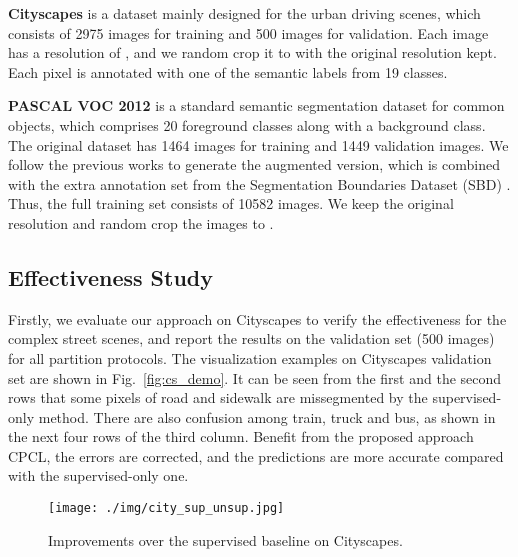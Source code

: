 \documentclass[journal]{IEEEtran}
\begin{document}
\textbf{Cityscapes} is a dataset mainly designed for the urban driving scenes, which consists of 2975 images for training and 500 images for validation. Each image 
has a resolution of , and we random crop it to  with the original resolution kept. Each pixel is annotated with 
one of the semantic labels from 19 classes. 

\textbf{PASCAL VOC 2012} is a standard semantic segmentation dataset for common objects, which comprises 20 foreground classes along with a background class. The 
original dataset has 1464 images for training and 1449 validation images. We follow the previous works to generate the augmented version, which is combined with 
the extra annotation set from the Segmentation Boundaries Dataset (SBD) \cite{SBD}. Thus, the full training set consists of 10582 images. We keep the original resolution and 
random crop the images to .

\subsection{Effectiveness Study}

Firstly, we evaluate our approach on Cityscapes to verify the effectiveness for the complex street scenes, and report the results on the validation set (500 images) for 
all partition protocols. The visualization examples on Cityscapes validation set are shown in Fig.~\ref{fig:cs_demo}. It can be seen from the first and the second 
rows that some pixels of road and sidewalk are missegmented by the supervised-only method. There are also confusion among train, truck and bus, as shown in the next 
four rows of the third column. Benefit from the proposed approach CPCL, the errors are corrected, and the predictions are more accurate compared with the supervised-only one.

\begin{figure}[h]
  \centering
  \texttt{[image: ./img/city\_sup\_unsup.jpg]}
  \caption{Improvements over the supervised baseline on Cityscapes.}
  \label{fig:city_sup_unsup}
\end{figure}
\end{document}
